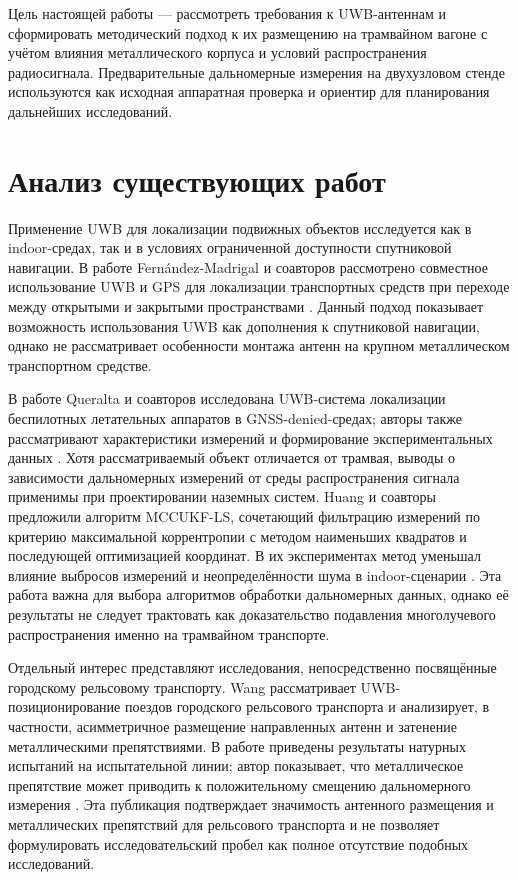 \documentclass{misisarticle}
\begin{document}
Цель настоящей работы — рассмотреть требования к UWB-антеннам и сформировать методический подход к их размещению на трамвайном вагоне с учётом влияния металлического корпуса и условий распространения радиосигнала. Предварительные дальномерные измерения на двухузловом стенде используются как исходная аппаратная проверка и ориентир для планирования дальнейших исследований.

\section{Анализ существующих работ}

Применение UWB для локализации подвижных объектов исследуется как в indoor-средах, так и в условиях ограниченной доступности спутниковой навигации. В работе Fernández-Madrigal и соавторов рассмотрено совместное использование UWB и GPS для локализации транспортных средств при переходе между открытыми и закрытыми пространствами \cite{fernandez2007application}. Данный подход показывает возможность использования UWB как дополнения к спутниковой навигации, однако не рассматривает особенности монтажа антенн на крупном металлическом транспортном средстве.

В работе Queralta и соавторов исследована UWB-система локализации беспилотных летательных аппаратов в GNSS-denied-средах; авторы также рассматривают характеристики измерений и формирование экспериментальных данных \cite{queralta2020uwb}. Хотя рассматриваемый объект отличается от трамвая, выводы о зависимости дальномерных измерений от среды распространения сигнала применимы при проектировании наземных систем. Huang и соавторы предложили алгоритм MCCUKF-LS, сочетающий фильтрацию измерений по критерию максимальной коррентропии с методом наименьших квадратов и последующей оптимизацией координат. В их экспериментах метод уменьшал влияние выбросов измерений и неопределённости шума в indoor-сценарии \cite{huang2024design}. Эта работа важна для выбора алгоритмов обработки дальномерных данных, однако её результаты не следует трактовать как доказательство подавления многолучевого распространения именно на трамвайном транспорте.

Отдельный интерес представляют исследования, непосредственно посвящённые городскому рельсовому транспорту. Wang рассматривает UWB-позиционирование поездов городского рельсового транспорта и анализирует, в частности, асимметричное размещение направленных антенн и затенение металлическими препятствиями. В работе приведены результаты натурных испытаний на испытательной линии; автор показывает, что металлическое препятствие может приводить к положительному смещению дальномерного измерения \cite{wang2025rail}. Эта публикация подтверждает значимость антенного размещения и металлических препятствий для рельсового транспорта и не позволяет формулировать исследовательский пробел как полное отсутствие подобных исследований.
\end{document}
